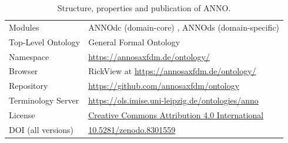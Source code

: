\documentclass[sw]{iosart2x}
\begin{document}
\begin{table}[h]
\centering
\caption{Structure, properties and publication of ANNO.}
\label{tab:publication}
\begin{tabular}{ll}
\toprule
Modules				&ANNOdc (domain-core) , ANNOds (domain-specific)\\
Top-Level Ontology	&General Formal Ontology~\citep{gfo}\\
Namespace			&\url{https://annosaxfdm.de/ontology/}\\
Browser				&RickView\tablefootnote{\url{https://github.com/KonradHoeffner/rickview}} at \url{https://annosaxfdm.de/ontology/}\\
Repository			&\url{https://github.com/annosaxfdm/ontology}\\
Terminology Server	&\url{https://ols.imise.uni-leipzig.de/ontologies/anno}\\
License				&\href{https://creativecommons.org/licenses/by/4.0/}{Creative Commons Attribution 4.0 International}\\
DOI (all versions)	&\href{https://doi.org/10.5281/zenodo.8301559}{10.5281/zenodo.8301559}\\
\bottomrule
\end{tabular}
\end{table}
\end{document}
